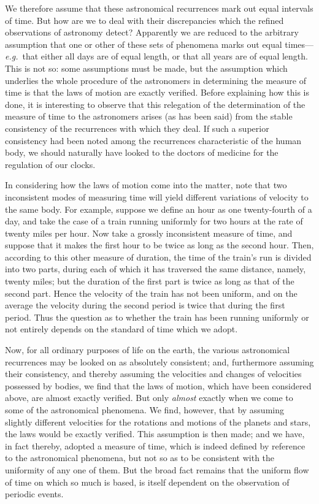 \documentclass[12pt,leqno]{book}[2005/09/16]
\newcommand{\PageSep}[1]{\ignorespaces}
\newcommand{\eg}{\emph{e.g.}}
\begin{document}
We therefore assume that these astronomical
%
recurrences mark out equal intervals of
time. But how are we to deal with their
discrepancies which the refined observations
of astronomy detect? Apparently we are
reduced to the arbitrary assumption that one
or other of these sets of phenomena marks out
equal times---\eg\ that either all days are of
equal length, or that all years are of equal
length. This is not so: some assumptions
must be made, but the assumption which
underlies the whole procedure of the astronomers
in determining the measure of time is
that the laws of motion are exactly verified.
\PageSep{168}
Before explaining how this is done, it is interesting
to observe that this relegation of
the determination of the measure of time to
the astronomers arises (as has been said) from
the stable consistency of the recurrences with
which they deal. If such a superior consistency
had been noted among the recurrences
characteristic of the human body, we
should naturally have looked to the doctors
of medicine for the regulation of our clocks.

In considering how the laws of motion
come into the matter, note that two inconsistent
modes of measuring time will yield
different variations of velocity to the same
body. For example, suppose we define an
hour as one twenty-fourth of a day, and take
the case of a train running uniformly for two
hours at the rate of twenty miles per hour.
Now take a grossly inconsistent measure of
time, and suppose that it makes the first hour
to be twice as long as the second hour. Then,
according to this other measure of duration,
the time of the train's run is divided into
two parts, during each of which it has traversed
the same distance, namely, twenty
miles; but the duration of the first part is
twice as long as that of the second part.
Hence the velocity of the train has not been
uniform, and on the average the velocity
during the second period is twice that during
the first period. Thus the question as to
\PageSep{169}
whether the train has been running uniformly
or not entirely depends on the standard of
time which we adopt.

Now, for all ordinary purposes of life on the
earth, the various astronomical recurrences
may be looked on as absolutely consistent;
and, furthermore assuming their consistency,
and thereby assuming the velocities and
changes of velocities possessed by bodies, we
find that the laws of motion, which have
been considered above, are almost exactly
verified. But only \emph{almost} exactly when we
come to some of the astronomical phenomena.
We find, however, that by assuming slightly
different velocities for the rotations and
motions of the planets and stars, the laws
would be exactly verified. This assumption
is then made; and we have, in fact thereby,
adopted a measure of time, which is indeed
defined by reference to the astronomical
phenomena, but not so as to be consistent
with the uniformity of any one of them. But
the broad fact remains that the uniform flow
of time on which so much is based, is itself
dependent on the observation of periodic
events.
\end{document}

